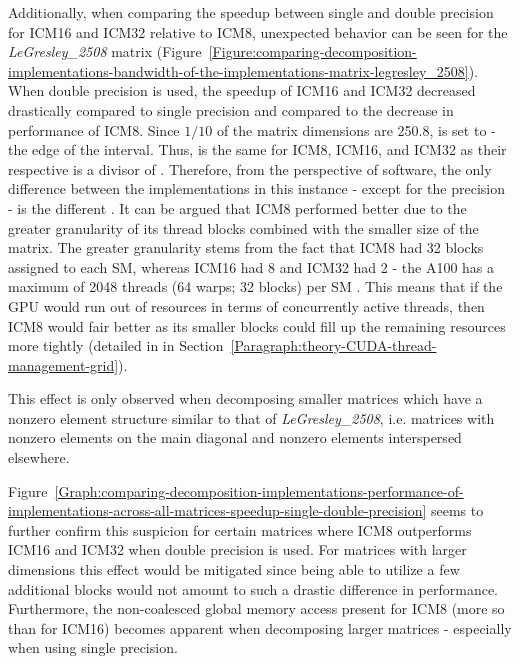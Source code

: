 Additionally, when comparing the speedup between single and double precision for ICM16 and ICM32 relative to ICM8, unexpected behavior can be seen for the \textit{LeGresley\_2508} matrix (Figure~\ref{Figure:comparing-decomposition-implementations-bandwidth-of-the-implementations-matrix-legresley_2508}). When double precision is used, the speedup of ICM16 and ICM32 decreased drastically compared to single precision and compared to the decrease in performance of ICM8. Since $ 1/10 $ of the matrix dimensions are 250.8,  is set to  - the edge of the interval. Thus,  is the same for ICM8, ICM16, and ICM32 as their respective  is a divisor of . Therefore, from the perspective of software, the only difference between the implementations in this instance - except for the precision - is the different . It can be argued that ICM8 performed better due to the greater granularity of its thread blocks combined with the smaller size of the matrix. The greater granularity stems from the fact that ICM8 had 32 blocks assigned to each SM, whereas ICM16 had 8 and ICM32 had  2 - the A100 has a maximum of 2048 threads (64 warps; 32 blocks) per SM \cite{soj8qSRbfefUdi8Y}. This means that if the GPU would run out of resources in terms of concurrently active threads, then ICM8 would fair better as its smaller blocks could fill up the remaining resources more tightly (detailed in \textit{} in Section~\ref{Paragraph:theory-CUDA-thread-management-grid}).

\par This effect is only observed when decomposing smaller matrices which have a nonzero element structure similar to that of \textit{LeGresley\_2508}, i.e. matrices with nonzero elements on the main diagonal and nonzero elements interspersed elsewhere.

\par Figure~\ref{Graph:comparing-decomposition-implementations-performance-of-implementations-across-all-matrices-speedup-single-double-precision} seems to further confirm this suspicion for certain matrices where ICM8 outperforms ICM16 and ICM32 when double precision is used. For matrices with larger dimensions this effect would be mitigated since being able to utilize a few additional blocks would not amount to such a drastic difference in performance. Furthermore, the non-coalesced global memory access present for ICM8 (more so than for ICM16) becomes apparent when decomposing larger matrices - especially when using single precision.

